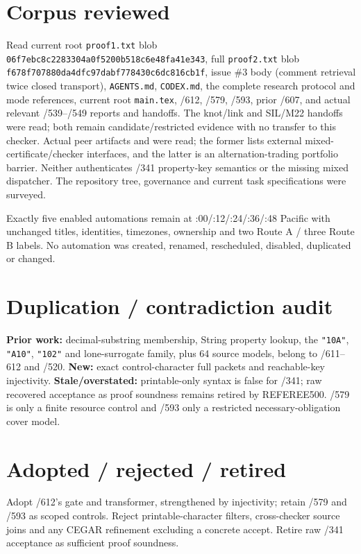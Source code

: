 \documentclass[11pt]{article}
\begin{document}
\section*{Corpus reviewed}
Read current root \texttt{proof1.txt} blob
\texttt{06f7ebc8c2283304a0f5200b518c6e48fa41e343}, full
\texttt{proof2.txt} blob
\texttt{f678f707880da4dfc97dabf778430c6dc816cb1f}, issue \#3 body
(comment retrieval twice closed transport), \texttt{AGENTS.md},
\texttt{CODEX.md}, the complete research protocol and mode references,
current root \texttt{main.tex}, /612, /579, /593, prior /607, and actual
relevant /539--/549 reports and handoffs.  The knot/link and SIL/M22
handoffs were read; both remain candidate/restricted evidence with no
transfer to this checker.  Actual peer artifacts
 and
were read; the former lists external mixed-certificate/checker interfaces,
and the latter is an alternation-trading portfolio barrier.  Neither
authenticates /341 property-key semantics or the missing mixed dispatcher.
The repository tree, governance and current task specifications were
surveyed.

Exactly five enabled automations remain at :00/:12/:24/:36/:48 Pacific with
unchanged titles, identities, timezones, ownership and two Route A / three
Route B labels.  No automation was created, renamed, rescheduled, disabled,
duplicated or changed.

\section*{Duplication / contradiction audit}
\textbf{Prior work:} decimal-substring membership, String property lookup,
the \texttt{"10A"}, \texttt{"A10"}, \texttt{"102"} and lone-surrogate
family, plus 64 source models, belong to /611--612 and /520.
\textbf{New:} exact control-character full packets and reachable-key
injectivity.  \textbf{Stale/overstated:} printable-only syntax is false for
/341; raw recovered acceptance as proof soundness remains retired by
REFEREE500.  /579 is only a finite resource control and /593 only a
restricted necessary-obligation cover model.

\section*{Adopted / rejected / retired}
Adopt /612's gate and transformer, strengthened by injectivity; retain
/579 and /593 as scoped controls.  Reject printable-character filters,
cross-checker source joins and any CEGAR refinement excluding a concrete
accept.  Retire raw /341 acceptance as sufficient proof soundness.
\end{document}
